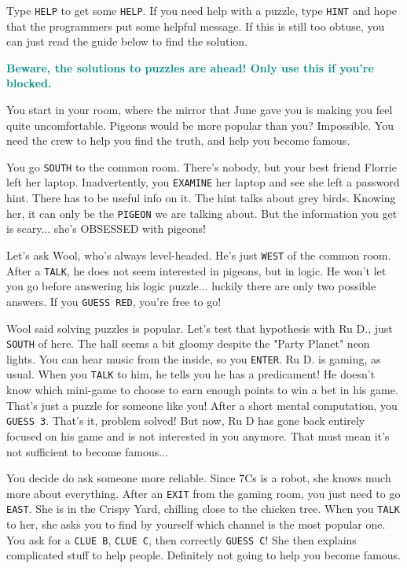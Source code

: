 \documentclass{article}
\newcommand{\bo}[1] {\textbf{#1}}
\newcommand{\bblu}[1] {\textbf{\textcolor{darkcyan}{#1}}}
\newcommand{\bckg}[1]{\AddToShipoutPictureBG*{\texttt{[image: \#1]}}}
\begin{document}
Type \texttt{HELP} to get some \texttt{HELP}.
If you need help with a puzzle, type \texttt{HINT} and hope that the programmers put some helpful message.
If this is still too obtuse, you can just read the guide below to find the solution.

\clearpage

\clearpage
{}
\bckg{img/bg}

\bblu{\bo{Beware, the solutions to puzzles are ahead! Only use this if you're blocked.}}

You start in your room, where the mirror that June gave you is making you feel quite uncomfortable.
Pigeons would be more popular than you? Impossible.
You need the crew to help you find the truth, and help you become famous.

You go \texttt{SOUTH} to the common room.
There's nobody, but your best friend Florrie left her laptop.
Inadvertently, you \texttt{EXAMINE} her laptop and see she left a password hint.
There has to be useful info on it. The hint talks about grey birds.
Knowing her, it can only be the \texttt{PIGEON} we are talking about.
But the information you get is scary... she's OBSESSED with pigeons!

Let's ask Wool, who's always level-headed. He's just \texttt{WEST} of the common room.
After a \texttt{TALK}, he does not seem interested in pigeons, but in logic.
He won't let you go before answering his logic puzzle... luckily there are only two possible answers.
If you \texttt{GUESS RED}, you're free to go!

Wool said solving puzzles is popular.
Let's test that hypothesis with Ru D., just \texttt{SOUTH} of here.
The hall seems a bit gloomy despite the "Party Planet" neon lights.
You can hear music from the inside, so you \texttt{ENTER}.
Ru D. is gaming, as usual. When you \texttt{TALK} to him, he tells you he has a predicament!
He doesn't know which mini-game to choose to earn enough points to win a bet in his game.
That's just a puzzle for someone like you!
After a short mental computation, you \texttt{GUESS 3}. That's it, problem solved!
But now, Ru D has gone back entirely focused on his game and is not interested in you anymore.
That must mean it's not sufficient to become famous...

You decide do ask someone more reliable.
Since 7Cs is a robot, she knows much more about everything.
After an \texttt{EXIT} from the gaming room, you just need to go \texttt{EAST}.
She is in the Crispy Yard, chilling close to the chicken tree.
When you \texttt{TALK} to her, she asks you to find by yourself which channel is the most popular one.
You ask for a \texttt{CLUE B}, \texttt{CLUE C}, then correctly \texttt{GUESS C}!
She then explains complicated stuff to help people.
Definitely not going to help you become famous.
\end{document}
